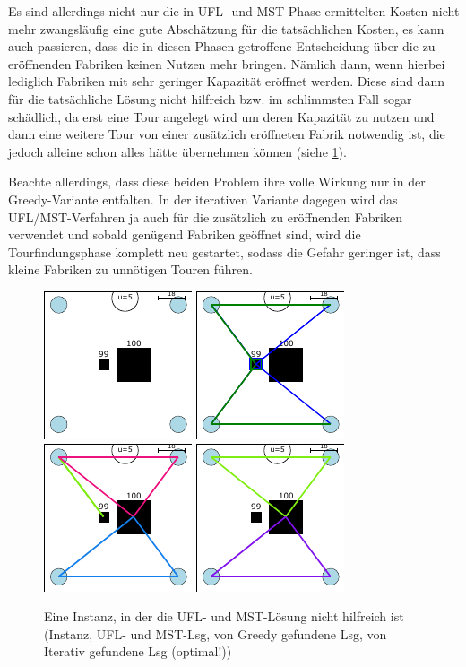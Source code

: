 \documentclass[a4paper,ngerman,11pt,bibtotoc]{scrartcl}
\theoremstyle{definition}
\theoremstyle{plain}
\theoremstyle{remark}
\newcommand{\MST}{MST}
\newcommand{\UFL}{UFL}
\begin{document}
	Es sind allerdings nicht nur die in \UFL- und \MST-Phase ermittelten Kosten nicht mehr zwangsläufig eine gute Abschätzung für die tatsächlichen Kosten, es kann auch passieren, dass die in diesen Phasen getroffene Entscheidung über die zu eröffnenden Fabriken keinen Nutzen mehr bringen. Nämlich dann, wenn hierbei lediglich Fabriken mit sehr geringer Kapazität eröffnet werden. Diese sind dann für die tatsächliche Lösung nicht hilfreich bzw. im schlimmsten Fall sogar schädlich, da erst eine Tour angelegt wird um deren Kapazität zu nutzen und dann eine weitere Tour von einer zusätzlich eröffneten Fabrik notwendig ist, die jedoch alleine schon alles hätte übernehmen können (siehe \cref{fig:bsp:UFLMSTnutzlos}).
	
	Beachte allerdings, dass diese beiden Problem ihre volle Wirkung nur in der Greedy-Variante entfalten. In der iterativen Variante dagegen wird das \UFL/\MST-Verfahren ja auch für die zusätzlich zu eröffnenden Fabriken verwendet und sobald genügend Fabriken geöffnet sind, wird die Tourfindungsphase komplett neu gestartet, sodass die Gefahr geringer ist, dass kleine Fabriken zu unnötigen Touren führen.
		
	\begin{figure}[h]\centering
		\includegraphics[width=.24\textwidth]{bilder/beispiele/bsp2-instance.pdf}
		\includegraphics[width=.24\textwidth]{bilder/beispiele/bsp2-UFLMST.pdf}
		\includegraphics[width=.24\textwidth]{bilder/beispiele/bsp2-Greedy.pdf}
		\includegraphics[width=.24\textwidth]{bilder/beispiele/bsp2-It.pdf}
		\caption{Eine Instanz, in der die \UFL- und \MST-Lösung nicht hilfreich ist (Instanz, \UFL- und \MST-Lsg, von Greedy gefundene Lsg, von Iterativ gefundene Lsg (optimal!))}\label{fig:bsp:UFLMSTnutzlos}
	\end{figure}
\end{document}
